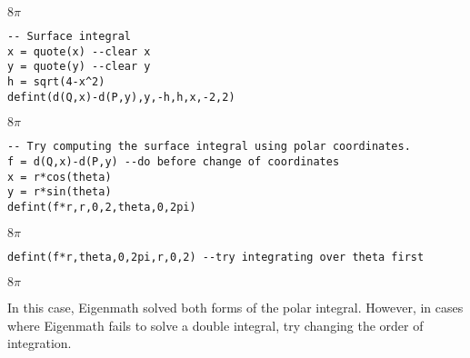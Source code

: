 \noindent
$\displaystyle 8\pi$

\begin{Verbatim}[formatcom=\color{blue},samepage=true]
-- Surface integral
x = quote(x) --clear x
y = quote(y) --clear y
h = sqrt(4-x^2)
defint(d(Q,x)-d(P,y),y,-h,h,x,-2,2)
\end{Verbatim}

\noindent
$\displaystyle 8\pi$

\begin{Verbatim}[formatcom=\color{blue},samepage=true]
-- Try computing the surface integral using polar coordinates.
f = d(Q,x)-d(P,y) --do before change of coordinates
x = r*cos(theta)
y = r*sin(theta)
defint(f*r,r,0,2,theta,0,2pi)
\end{Verbatim}

\noindent
$\displaystyle 8\pi$

\begin{Verbatim}[formatcom=\color{blue},samepage=true]
defint(f*r,theta,0,2pi,r,0,2) --try integrating over theta first
\end{Verbatim}

\noindent
$\displaystyle 8\pi$

\bigskip
\noindent
In this case, Eigenmath solved both forms of the polar integral.
However, in cases where Eigenmath fails to solve a double integral, try
changing the order of integration.
